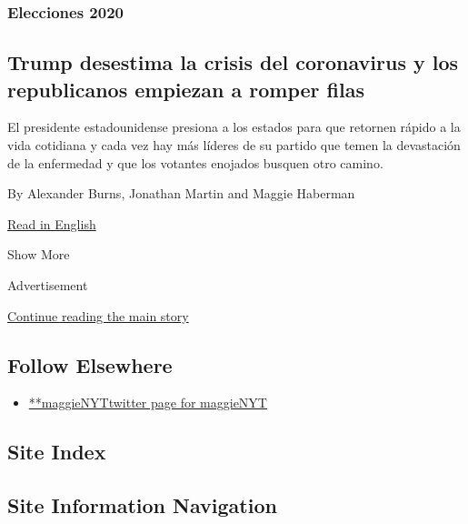 \begin{enumerate}
  \hypertarget{elecciones-2020}{%
  \subsubsection{Elecciones 2020}\label{elecciones-2020}}

  \hypertarget{trump-desestima-la-crisis-del-coronavirus-y-los-republicanos-empiezan-a-romper-filas}{%
  \subsection{Trump desestima la crisis del coronavirus y los
  republicanos empiezan a romper
  filas}\label{trump-desestima-la-crisis-del-coronavirus-y-los-republicanos-empiezan-a-romper-filas}}

  El presidente estadounidense presiona a los estados para que retornen
  rápido a la vida cotidiana y cada vez hay más líderes de su partido
  que temen la devastación de la enfermedad y que los votantes enojados
  busquen otro camino.

  By Alexander Burns, Jonathan Martin and Maggie Haberman

  \href{https://www.nytimes.com/2020/07/19/us/politics/republicans-contradict-trump-coronavirus.html}{Read
  in English}
\end{enumerate}

Show More

Advertisement

\protect\hyperlink{after-mid2}{Continue reading the main story}

\hypertarget{follow-elsewhere}{%
\subsection{Follow Elsewhere}\label{follow-elsewhere}}

\begin{itemize}
\tightlist
\item
  \href{https://twitter.com/maggieNYT}{**maggieNYTtwitter page for
  maggieNYT}
\end{itemize}

\hypertarget{site-index}{%
\subsection{Site Index}\label{site-index}}

\hypertarget{site-information-navigation}{%
\subsection{Site Information
Navigation}\label{site-information-navigation}}

